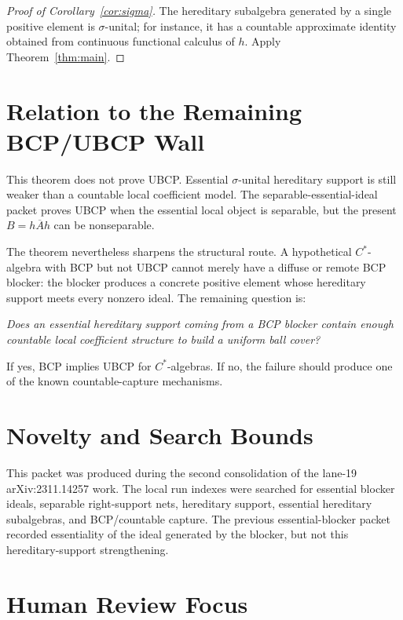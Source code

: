 \documentclass[11pt]{article}
\begin{document}
\begin{proof}[Proof of Corollary~\ref{cor:sigma}]
The hereditary subalgebra generated by a single positive element is
\(\sigma\)-unital; for instance, it has a countable approximate identity
obtained from continuous functional calculus of \(h\).  Apply
Theorem~\ref{thm:main}.
\end{proof}

\section*{Relation to the Remaining BCP/UBCP Wall}

This theorem does not prove UBCP.  Essential \(\sigma\)-unital hereditary
support is still weaker than a countable local coefficient model.  The
separable-essential-ideal packet proves UBCP when the essential local object
is separable, but the present \(B=\overline{hAh}\) can be nonseparable.

The theorem nevertheless sharpens the structural route.  A hypothetical
\(C^*\)-algebra with BCP but not UBCP cannot merely have a diffuse or remote
BCP blocker: the blocker produces a concrete positive element whose
hereditary support meets every nonzero ideal.  The remaining question is:

\begin{center}
\emph{Does an essential hereditary support coming from a BCP blocker contain
enough countable local coefficient structure to build a uniform ball cover?}
\end{center}

If yes, BCP implies UBCP for \(C^*\)-algebras.  If no, the failure should
produce one of the known countable-capture mechanisms.

\section*{Novelty and Search Bounds}

This packet was produced during the second consolidation of the lane-19
arXiv:2311.14257 work.  The local run indexes were searched for essential
blocker ideals, separable right-support nets, hereditary support, essential
hereditary subalgebras, and BCP/countable capture.  The previous
essential-blocker packet recorded essentiality of the ideal generated by the
blocker, but not this hereditary-support strengthening.

\section*{Human Review Focus}
\end{document}
